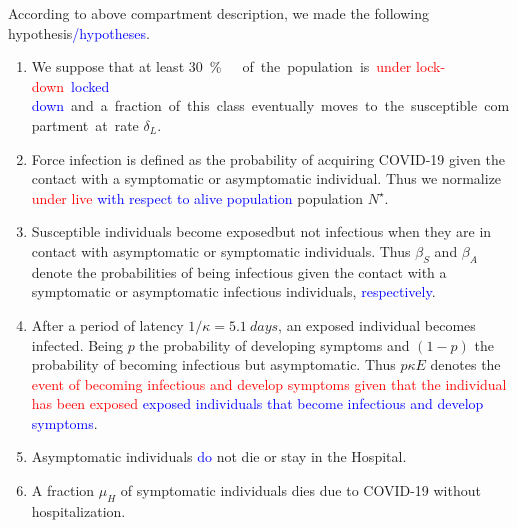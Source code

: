 \begin{hypotheses}
    According to above compartment description, we made the following
    hypothesis\textcolor{blue}{/hypotheses}.
    \begin{enumerate}[(H-1)]
        \item
            We suppose that at least \SI{30}\percent  \  of the population is
            \textcolor{red}{under lock-down} \textcolor{blue}{locked down} and a fraction of this class eventually moves
            to the susceptible compartment at rate $\delta_L$.
        \item
            Force infection is defined as the probability of acquiring COVID-19
            given the contact with a symptomatic or asymptomatic individual.
            Thus we normalize \textcolor{red}{under  live} \textcolor{blue}{with respect to alive population} population
            $
                N^{\star}
            $.
        \item
            Susceptible individuals become
            exposed\textemdash but not infectious\textemdash
            when they are in contact with asymptomatic or symptomatic
            individuals. Thus $\beta_S$ and $\beta_A$ denote the
            probabilities of being infectious given the contact with a symptomatic or
            asymptomatic infectious individuals,  \textcolor{blue}{respectively}.
        \item
            After a period of latency  $1/\kappa = \SI{5.1}{days}$, an
            exposed individual becomes infected. Being $p$ the probability of
            developing symptoms and $(1-p)$ the probability of becoming infectious
            but asymptomatic. Thus $p\kappa E$ denotes the
            \textcolor{red}{event of becoming infectious and develop symptoms given that the
            individual has been exposed} \textcolor{blue}{exposed individuals that become infectious and develop symptoms}. 
        \item
            Asymptomatic individuals \textcolor{blue}{do} not die or stay in the Hospital.
        \item
            A fraction $\mu_{H}$ of symptomatic individuals
            dies due to COVID-19 without hospitalization.
    \end{enumerate}
\end{hypotheses}




